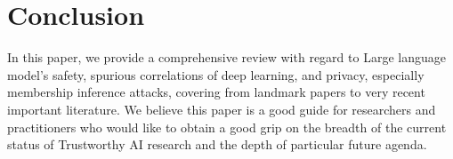 \vspace{-0.2cm}
\section{Conclusion}

In this paper, we provide a comprehensive review with regard to Large language model's safety, spurious correlations of deep learning, and privacy, especially membership inference attacks, covering from landmark papers to very recent important literature. 
We believe this paper is a good guide for researchers and practitioners who would like to obtain a good grip on the breadth of the current status of Trustworthy AI research and the depth of particular future agenda. 